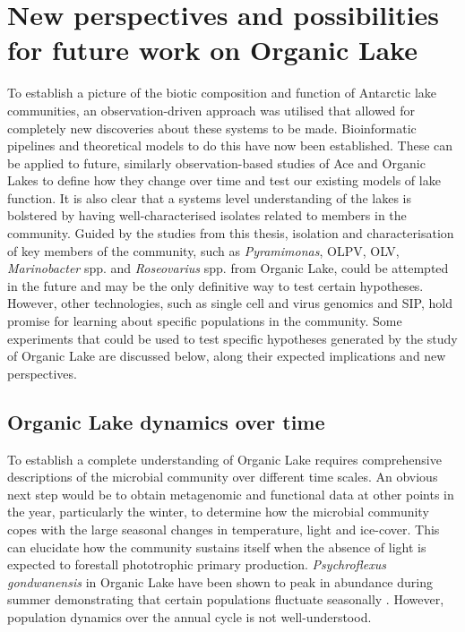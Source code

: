 \section{New perspectives and possibilities for future work on Organic Lake}
To establish a picture of the biotic composition and function of Antarctic lake communities, an observation-driven approach was utilised that allowed for completely new discoveries about these systems to be made.
Bioinformatic pipelines and theoretical models to do this have now been established.
These can be applied to future, similarly observation-based studies of Ace and Organic Lakes to define how they change over time and test our existing models of lake function.
It is also clear that a systems level understanding of the lakes is bolstered by having well-characterised isolates related to members in the community.
Guided by the studies from this thesis, isolation and characterisation of key members of the community, such as \emph{Pyramimonas}, \ac{OLPV}, \ac{OLV}, \emph{Marinobacter} spp. and \emph{Roseovarius} spp. from Organic Lake, could be attempted in the future and may be the only definitive way to test certain hypotheses.
However, other technologies, such as single cell and virus genomics and \ac{SIP}, hold promise for learning about specific populations in the community.
Some experiments that could be used to test specific hypotheses generated by the study of Organic Lake are discussed below, along their expected implications and new perspectives.

\subsection{Organic Lake dynamics over time}
To establish a complete understanding of Organic Lake requires comprehensive descriptions of the microbial community over different time scales.
An obvious next step would be to obtain metagenomic and functional data at other points in the year, particularly the winter, to determine how the microbial community copes with the large seasonal changes in temperature, light and ice-cover.
This can elucidate how the community sustains itself when the absence of light is expected to forestall phototrophic primary production.
\emph{Psychroflexus gondwanensis} in Organic Lake have been shown to peak in abundance during summer demonstrating that certain populations fluctuate seasonally \cite{James1994}.
However, population dynamics over the annual cycle is not well-understood.


